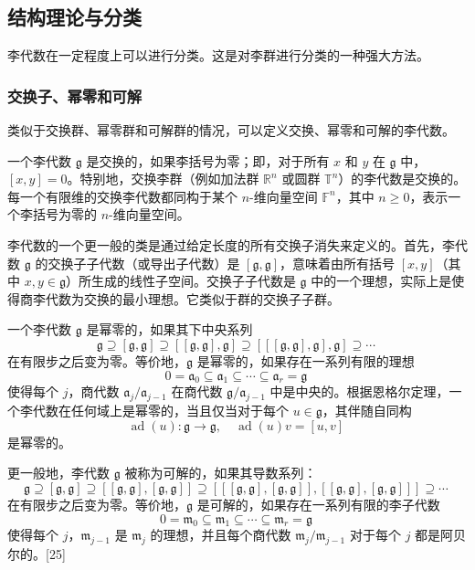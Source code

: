 \subsection{结构理论与分类}  
李代数在一定程度上可以进行分类。这是对李群进行分类的一种强大方法。
\subsubsection{交换子、幂零和可解}  
类似于交换群、幂零群和可解群的情况，可以定义交换、幂零和可解的李代数。

一个李代数 \({\mathfrak {g}}\) 是交换的，如果李括号为零；即，对于所有 \(x\) 和 \(y\) 在 \({\mathfrak {g}}\) 中，\([x,y] = 0\)。特别地，交换李群（例如加法群 \(\mathbb {R} ^{n}\) 或圆群 \(\mathbb {T} ^{n}\)）的李代数是交换的。每一个有限维的交换李代数都同构于某个 \(n\)-维向量空间 \({\mathbb {F}}^{n}\)，其中 \(n \geq 0\)，表示一个李括号为零的 \(n\)-维向量空间。

李代数的一个更一般的类是通过给定长度的所有交换子消失来定义的。首先，李代数 \({\mathfrak {g}}\) 的交换子子代数（或导出子代数）是 \([{\mathfrak {g}},{\mathfrak {g}}]\)，意味着由所有括号 \([x,y]\)（其中 \(x,y \in {\mathfrak {g}}\)）所生成的线性子空间。交换子子代数是 \({\mathfrak {g}}\) 中的一个理想，实际上是使得商李代数为交换的最小理想。它类似于群的交换子子群。

一个李代数 \(\mathfrak{g}\) 是幂零的，如果其下中央系列
\[
\mathfrak{g} \supseteq [\mathfrak{g}, \mathfrak{g}] \supseteq [[\mathfrak{g}, \mathfrak{g}], \mathfrak{g}] \supseteq [[[{\mathfrak{g}}, {\mathfrak{g}}], \mathfrak{g}], \mathfrak{g}] \supseteq \cdots~
\]
在有限步之后变为零。等价地，\(\mathfrak{g}\) 是幂零的，如果存在一系列有限的理想
\[
0 = \mathfrak{a}_0 \subseteq \mathfrak{a}_1 \subseteq \cdots \subseteq \mathfrak{a}_r = \mathfrak{g}~
\]
使得每个 \(j\)，商代数 \(\mathfrak{a}_j / \mathfrak{a}_{j-1}\) 在商代数 \(\mathfrak{g} / \mathfrak{a}_{j-1}\) 中是中央的。根据恩格尔定理，一个李代数在任何域上是幂零的，当且仅当对于每个 \(u \in \mathfrak{g}\)，其伴随自同构
\[
\operatorname{ad}(u): \mathfrak{g} \to \mathfrak{g}, \quad \operatorname{ad}(u)v = [u, v]~
\]
是幂零的。

更一般地，李代数 \(\mathfrak{g}\) 被称为可解的，如果其导数系列：
\[
\mathfrak{g} \supseteq [\mathfrak{g}, \mathfrak{g}] \supseteq [[\mathfrak{g}, \mathfrak{g}], [\mathfrak{g}, \mathfrak{g}]] \supseteq [[[{\mathfrak{g}}, {\mathfrak{g}}], [{\mathfrak{g}}, {\mathfrak{g}}]], [[{\mathfrak{g}}, {\mathfrak{g}}], [{\mathfrak{g}}, {\mathfrak{g}}]]] \supseteq \cdots~
\]
在有限步之后变为零。等价地，\(\mathfrak{g}\) 是可解的，如果存在一系列有限的李子代数
\[
0 = \mathfrak{m}_0 \subseteq \mathfrak{m}_1 \subseteq \cdots \subseteq \mathfrak{m}_r = \mathfrak{g}~
\]
使得每个 \(j\)，\(\mathfrak{m}_{j-1}\) 是 \(\mathfrak{m}_j\) 的理想，并且每个商代数 \(\mathfrak{m}_j / \mathfrak{m}_{j-1}\) 对于每个 \(j\) 都是阿贝尔的。[25]

